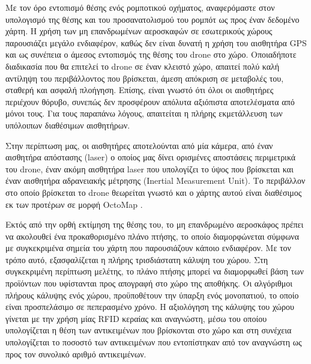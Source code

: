 Με τον όρο εντοπισμό θέσης ενός ρομποτικού οχήματος, αναφερόμαστε στον υπολογισμό της θέσης και του προσανατολισμού του ρομπότ ως προς έναν δεδομένο χάρτη. Η χρήση των μη επανδρωμένων αεροσκαφών σε εσωτερικούς χώρους παρουσιάζει μεγάλο ενδιαφέρον, καθώς δεν είναι δυνατή η χρήση του αισθητήρα GPS και ως συνέπεια ο άμεσος εντοπισμός της θέσης του drone στο χώρο. Οποιαδήποτε διαδικασία που θα επιτελεί το drone σε έναν κλειστό χώρο, απαιτεί πολύ καλή αντίληψη του περιβάλλοντος που βρίσκεται, άμεση απόκριση σε μεταβολές του, σταθερή και ασφαλή πλοήγηση. Επίσης, είναι γνωστό ότι όλοι οι αισθητήρες περιέχουν θόρυβο, συνεπώς δεν προσφέρουν απόλυτα αξιόπιστα αποτελέσματα από μόνοι τους. Για τους παραπάνω λόγους, απαιτείται η πλήρης εκμετάλλευση των υπόλοιπων διαθέσιμων αισθητήρων. 

Στην περίπτωση μας, οι αισθητήρες αποτελούνται από μία κάμερα, από έναν αισθητήρα απόστασης (laser) ο οποίος μας δίνει ορισμένες αποστάσεις περιμετρικά του drone, έναν ακόμη αισθητήρα laser που υπολογίζει το ύψος που βρίσκεται και έναν αισθητήρα αδρανειακής μέτρησης (Inertial Measurement Unit). Το περιβάλλον στο οποίο βρίσκεται το drone θεωρείται γνωστό και ο χάρτης αυτού είναι διαθέσιμος εκ των προτέρων σε μορφή OctoMap \cite{hornung13auro}.

Εκτός από την ορθή εκτίμηση της θέσης του, το μη επανδρωμένο αεροσκάφος πρέπει να ακολουθεί ένα προκαθορισμένο πλάνο πτήσης, το οποίο διαμορφώνεται σύμφωνα με συγκεκριμένα σημεία του χάρτη που παρουσιάζουν κάποιο ενδιαφέρον. Με τον τρόπο αυτό, εξασφαλίζεται η πλήρης τρισδιάστατη κάλυψη του χώρου. Στη συγκεκριμένη περίπτωση μελέτης, το πλάνο πτήσης μπορεί να διαμορφωθεί βάση των προϊόντων που υφίστανται προς απογραφή στο χώρο της αποθήκης. Οι αλγόριθμοι πλήρους κάλυψης ενός χώρου, προϋποθέτουν την ύπαρξη ενός μονοπατιού, το οποίο είναι προσπελάσιμο σε πεπερασμένο χρόνο. Η αξιολόγηση της κάλυψης του χώρου γίνεται με την χρήση μίας RFID κεραίας και αναγνώστη, μέσω του οποίου υπολογίζεται η θέση των αντικειμένων που βρίσκονται στο χώρο και στη συνέχεια υπολογίζεται το ποσοστό των αντικειμένων που εντοπίστηκαν από τον αναγνώστη ως προς τον συνολικό αριθμό αντικειμένων.  

